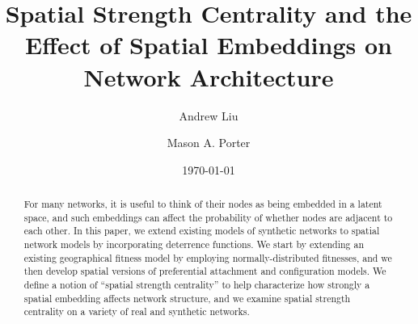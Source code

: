 \documentclass[%
 reprint,
 amsmath,amssymb,
 aps,
]{revtex4-1}
\begin{document}



\title{Spatial Strength Centrality and the Effect of Spatial Embeddings on Network Architecture}

\author{Andrew Liu}
%

\author{Mason A. Porter}
%

\date{\today}%

\begin{abstract}
For many networks, it is useful to think of their nodes as being embedded in a latent space, and such embeddings can affect the probability of whether nodes are adjacent to each other. In this paper, we extend existing models of synthetic networks to spatial network models by incorporating deterrence functions. We start by extending an existing geographical fitness model by employing normally-distributed fitnesses, and we then develop spatial versions of preferential attachment and configuration models. We define a notion of ``spatial strength centrality'' to help characterize how strongly a spatial embedding affects network structure, and we examine spatial strength centrality on a variety of real and synthetic networks.

\end{abstract}

\maketitle


\end{document}
